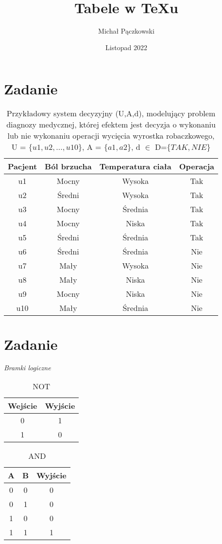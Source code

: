 \documentclass[12pt, letterpaper, titlepage]{article}
\title{Tabele w TeXu}
\author{Michał Pączkowski}
\date{Listopad 2022}
\begin{document}
\maketitle
\section{Zadanie}
\begin{table}[h]
\centering\caption{Przykładowy system decyzyjny (U,A,d), modelujący problem diagnozy medycznej, której efektem jest decyzja o wykonaniu lub nie wykonaniu operacji wycięcia wyrostka robaczkowego,\\ U = $\{u1, u2,...,u10\}$, A = $\{a1, a2\}$, d $\in$ D=$ \{TAK, NIE\}$}
\begin{tabular}{ c | c c c }
\hline
\hline
Pacjent & Ból brzucha & Temperatura ciała & Operacja\\
\hline
u1 & Mocny & Wysoka & Tak \\
u2 & Średni & Wysoka & Tak \\
u3 & Mocny & Średnia & Tak \\
u4 & Mocny & Niska & Tak \\
u5 & Średni & Średnia & Tak \\
u6 & Średni & Średnia & Nie \\
u7 & Mały & Wysoka & Nie \\
u8 & Mały & Niska & Nie \\
u9 & Mocny & Niska & Nie \\
u10 & Mały & Średnia & Nie \\
\hline
\hline
\end{tabular}
\end{table}

\section{Zadanie}
\textit{Bramki logiczne}
\begin{table}[h]
\centering
\caption*{NOT}
\begin{tabular}{ c | c }
\hline
\hline
Wejście & Wyjście\\
\hline
0 & 1\\
1 & 0\\
\hline
\hline
\end{tabular}
\end{table}

\begin{table}[h]
\centering
\caption*{AND}
\begin{tabular}{ c  c | c }
\hline
\hline
A & B & Wyjście\\
\hline
0 & 0 & 0\\
0 & 1 & 0\\
1 & 0 & 0\\
1 & 1 & 1\\
\hline
\hline
\end{tabular}
\end{table}
\end{document}

